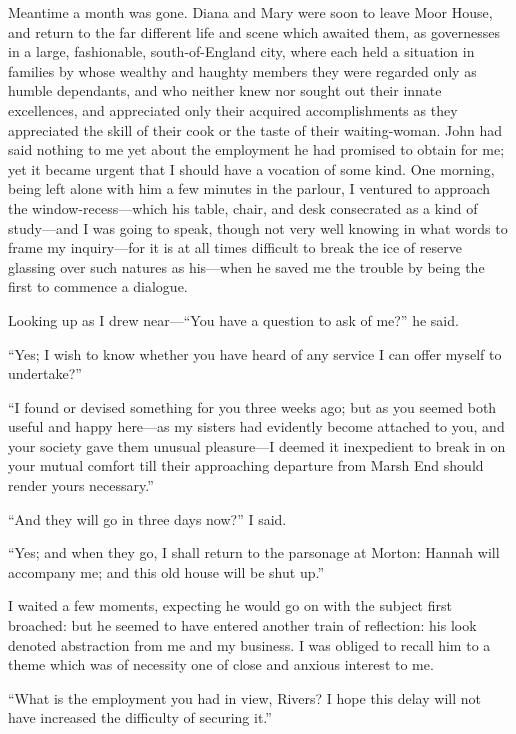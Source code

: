 Meantime a month was gone. Diana and Mary were soon to leave Moor
House, and return to the far different life and scene which awaited
them, as governesses in a large, fashionable, south-of-England city,
where each held a situation in families by whose wealthy and haughty
members they were regarded only as humble dependants, and who neither
knew nor sought out their innate excellences, and appreciated only their
acquired accomplishments as they appreciated the skill of their cook or
the taste of their waiting-woman. \Mr{} \St{} John had said nothing to me
yet about the employment he had promised to obtain for me; yet it became
urgent that I should have a vocation of some kind. One morning, being
left alone with him a few minutes in the parlour, I ventured to approach
the window-recess---which his table, chair, and desk consecrated as a
kind of study---and I was going to speak, though not very well knowing
in what words to frame my inquiry---for it is at all times difficult to
break the ice of reserve glassing over such natures as his---when he
saved me the trouble by being the first to commence a dialogue.

Looking up as I drew near---\enquote{You have a question to ask of me?}
he said.

\enquote{Yes; I wish to know whether you have heard of any service I can
offer myself to undertake?}

\enquote{I found or devised something for you three weeks ago; but as
you seemed both useful and happy here---as my sisters had evidently
become attached to you, and your society gave them unusual pleasure---I
deemed it inexpedient to break in on your mutual comfort till their
approaching departure from Marsh End should render yours necessary.}

\enquote{And they will go in three days now?} I said.

\enquote{Yes; and when they go, I shall return to the parsonage at
Morton: Hannah will accompany me; and this old house will be shut up.}

I waited a few moments, expecting he would go on with the subject first
broached: but he seemed to have entered another train of reflection: his
look denoted abstraction from me and my business. I was obliged to
recall him to a theme which was of necessity one of close and anxious
interest to me.

\enquote{What is the employment you had in view, \Mr{} Rivers? I hope
this delay will not have increased the difficulty of securing it.}

